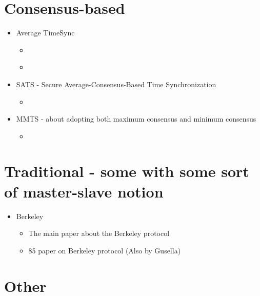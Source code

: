 \documentclass[a4paper,12pt]{article}
\begin{document}
\section{Consensus-based}

\begin{itemize}
\item Average TimeSync
  \begin{itemize}
  \item \cite{SchenatoGamba07}
  \item \cite{LucaFiorentin11}
  \end{itemize}
\end{itemize}

\begin{itemize}
\item SATS - Secure Average-Consensus-Based Time Synchronization
  \begin{itemize}
  \item \cite{HeChengShiChen13}
  \end{itemize}
\end{itemize}


\begin{itemize}
\item MMTS - about adopting both maximum consensus and minimum consensus
  \begin{itemize}
  \item \cite{HeLiChenCheng13}
  \end{itemize}
\end{itemize}

\section{Traditional - some with some sort of master-slave notion}

\begin{itemize}
\item Berkeley
  \begin{itemize}
  \item \cite{Gusella89} The main paper about the Berkeley protocol
  \item \cite{GusellaZatti86} 85 paper on Berkeley protocol (Also by Gusella)
  \end{itemize}
\end{itemize}

\section{Other}
\end{document}
